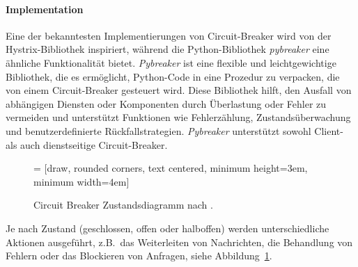 \paragraph{Implementation}


Eine der bekanntesten Implementierungen von Circuit-Breaker wird von der Hystrix-Bibliothek inspiriert,
während die Python-Bibliothek \textit{pybreaker} eine ähnliche Funktionalität bietet.
\textit{Pybreaker} ist eine flexible und leichtgewichtige Bibliothek, die es ermöglicht,
Python-Code in eine Prozedur zu verpacken, die von einem Circuit-Breaker gesteuert wird.
Diese Bibliothek hilft, den Ausfall von abhängigen Diensten oder Komponenten durch Überlastung
oder Fehler zu vermeiden und unterstützt Funktionen wie Fehlerzählung,
Zustandsüberwachung und benutzerdefinierte Rückfallstrategien. %
\textit{Pybreaker} unterstützt sowohl Client- als auch dienstseitige Circuit-Breaker.

\begin{figure}
 = [draw, rounded corners,
text centered, minimum height=3em, minimum width=4em]
\centering
\centering
{}
\caption{Circuit Breaker Zustandsdiagramm nach \cite{Montesi.19.09.2016}.}
\label{cb-fsm}
\end{figure}

Je nach Zustand (geschlossen, offen oder halboffen) werden unterschiedliche
Aktionen ausgeführt, z.B.\ das Weiterleiten von Nachrichten, die
Behandlung von Fehlern oder das Blockieren von Anfragen, siehe Abbildung~\ref{cb-fsm}.
